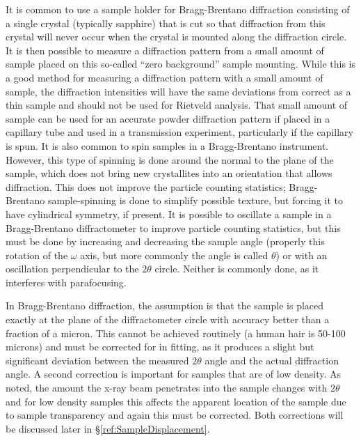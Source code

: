 It is common to use a sample holder for Bragg-Brentano diffraction consisting of a single crystal (typically sapphire) that is cut so that diffraction from this crystal will never occur when the crystal is mounted along the diffraction circle. It is then possible to measure a diffraction pattern from a small amount of sample placed on this so-called ``zero background'' sample mounting. While this is a good method for measuring a diffraction pattern with a small amount of sample, the diffraction intensities will have the same deviations from correct as a thin sample and should not be used for Rietveld analysis. That small amount of sample can be used for an accurate powder diffraction pattern if placed in a capillary tube and used in a transmission experiment, particularly if the capillary is spun. It is also common to spin samples in a Bragg-Brentano instrument. However, this type of spinning is done around the normal to the plane of the sample, which does not bring new crystallites into an orientation that allows diffraction. This does not improve the particle counting statistics; Bragg-Brentano sample-spinning is done to simplify possible texture, but forcing it to have cylindrical symmetry, if present. It is possible to oscillate a sample in a Bragg-Brentano diffractometer to improve particle counting statistics, but this must be done by increasing and decreasing the sample angle (properly this rotation of the $\omega$ axis, but more commonly the angle is called $\theta$) or with an oscillation  perpendicular to the $2\theta$ circle. Neither is commonly done, as it interferes with parafocusing. 

In Bragg-Brentano diffraction, the assumption is that the sample is placed exactly at the plane of the diffractometer circle with accuracy better than a fraction of a micron. This cannot be achieved routinely (a human hair is 50-100 microns) and must be corrected for in fitting, as it produces a slight but significant deviation between the measured $2\theta$ angle and the actual diffraction angle. A second correction is important for samples that are of low density. As noted, the amount the x-ray beam penetrates into the sample changes with $2\theta$ and for low density samples this affects the apparent location of the sample due to sample transparency and again this must be corrected. Both corrections will be discussed later in \S\ref{ref:SampleDisplacement}.

